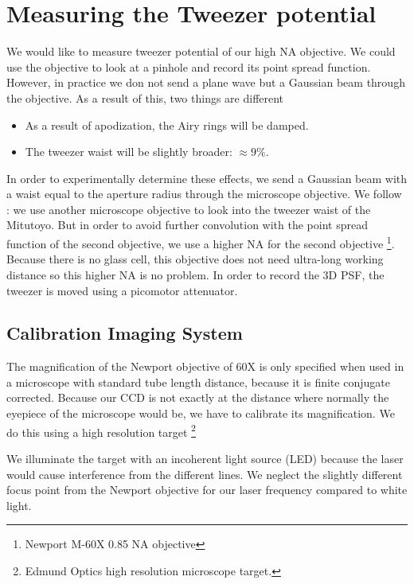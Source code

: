 \section{Measuring the Tweezer potential}

We would like to measure tweezer potential of our high NA objective. We could use the objective to look at a pinhole and record its point spread function. However, in practice we don not send a plane wave but a Gaussian beam through the objective. As a result of this, two things are different \cite{Sortais2007}

\begin{itemize}
    \item As a result of apodization, the Airy rings will be damped. 
    \item The tweezer waist will be slightly broader: $\approx 9\%$.
\end{itemize}

In order to experimentally determine these effects, we send a Gaussian beam with a waist equal to the aperture radius through the microscope objective. We follow \cite{Baumgaertner2017}: we use another microscope objective to look into the tweezer waist of the Mitutoyo. But in order to avoid further convolution with the point spread function of the second objective, we use a higher NA for the second objective \footnote{Newport M-60X 0.85 NA objective}. Because there is no glass cell, this objective does not need ultra-long working distance so this higher NA is no problem. In order to record the 3D PSF, the tweezer is moved using a picomotor attenuator. 

\subsection{Calibration Imaging System}

The magnification of the Newport objective of 60X is only specified when used in a microscope with standard tube length distance, because it is finite conjugate corrected. Because our CCD is not exactly at the distance where normally the eyepiece of the microscope would be, we have to calibrate its magnification. We do this using a high resolution target \footnote{Edmund Optics high resolution microscope target.} 

We illuminate the target with an incoherent light source (LED) because the laser would cause interference from the different lines. We neglect the slightly different focus point from the Newport objective for our laser frequency compared to white light. 

